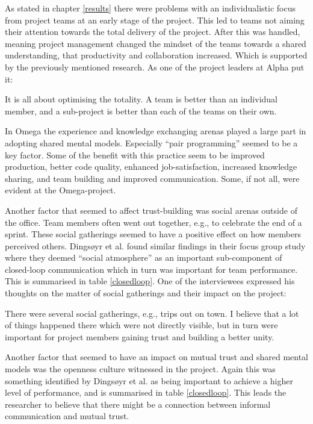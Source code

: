 As stated in chapter \ref{results} there were problems with an individualistic focus from project teams at an early stage of the project. This led to teams not aiming their attention towards the total delivery of the project. After this was handled, meaning project management changed the mindset of the teams towards a shared understanding, that productivity and collaboration increased. Which is supported by the previously mentioned research. As one of the project leaders at Alpha put it:

\begin{fancyquotes}
It is all about optimising the totality. A team is better than an individual member, and a sub-project is better than each of the teams on their own.
\end{fancyquotes}

In Omega the experience and knowledge exchanging arenas played a large part in adopting shared mental models. Especially ``pair programming'' seemed to be a key factor. Some of the benefit with this practice seem to be improved production, better code quality, enhanced job-satisfaction, increased knowledge sharing, and team building and improved communication. Some, if not all, were evident at the Omega-project.

Another factor that seemed to affect trust-building was social arenas outside of the office. Team members often went out together, e.g., to celebrate the end of a sprint. These social gatherings seemed to have a positive effect on how members perceived others. Dingsøyr et al. \cite{Dingsoyr2013c} found similar findings in their focus group study where they deemed ``social atmosphere'' as an important sub-component of closed-loop communication which in turn was important for team performance. This is summarised in table \ref{closedloop}. One of the interviewees expressed his thoughts on the matter of social gatherings and their impact on the project:

\begin{fancyquotes}
There were several social gatherings, e.g., trips out on town. I believe that a lot of things happened there which were not directly visible, but in turn were important for project members gaining trust and building a better unity.
\end{fancyquotes}

Another factor that seemed to have an impact on mutual trust and shared mental models was the openness culture witnessed in the project. Again this was something identified by Dingsøyr et al. \cite{Dingsoyr2013c} as being important to achieve a higher level of performance, and is summarised in table \ref{closedloop}. This leads the researcher to believe that there might be a connection between informal communication and mutual trust.

